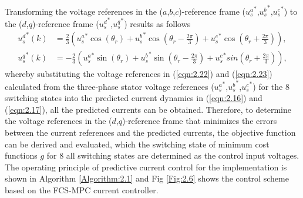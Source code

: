Transforming the voltage references in the ($a$,$b$,$c$)-reference frame (${u_{s}^a}^*$,${u_{s}^b}^*$,${u_{s}^c}^*$) to the ($d$,$q$)-reference frame (${u_{s}^d}^*$,${u_{s}^q}^*$) results as follows
\begin{align}\label{eqn:2.22}
{u_{s}^d}^*(k) &= \frac{2}{3} \left( {u_{s}^a}^* \cos\left(\theta_r\right) + {u_{s}^b}^* \cos\left(\theta_r - \frac{2\pi}{3}\right) + {u_{s}^c}^* \cos\left(\theta_r + \frac{2\pi}{3}\right) \right), \\\label{eqn:2.23}
{u_{s}^q}^*(k) &= -\frac{2}{3} \left( {u_{s}^a}^* \sin\left(\theta_r\right) + {u_{s}^b}^* \sin\left(\theta_r - \frac{2\pi}{3}\right) + {u_{s}^c}^* sin\left(\theta_r + \frac{2\pi}{3}\right) \right),
\end{align}
whereby substituting the voltage references in (\ref{eqn:2.22}) and (\ref{eqn:2.23}) calculated from the three-phase stator voltage references (${u_{s}^a}^*$,${u_{s}^b}^*$,${u_{s}^c}^*$) for the 8 switching states into the predicted current dynamics in (\ref{eqn:2.16}) and (\ref{eqn:2.17}), all the predicted currents can be obtained. Therefore, to determine the voltage references in the ($d$,$q$)-reference frame that minimizes the errors between the current references and the predicted currents, the objective function can be derived and evaluated, which the switching state of minimum cost functions $g$ for 8 all switching states are determined as the control input voltages. The operating principle of predictive current control for the implementation is shown in Algorithm \ref{Algorithm:2.1} and Fig \ref{Fig:2.6} shows the control scheme based on the FCS-MPC current controller. 

